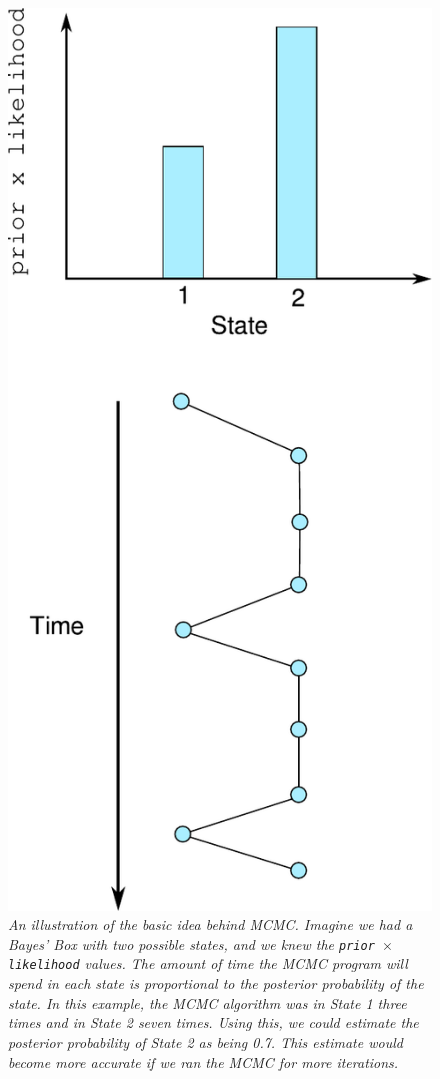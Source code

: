 \begin{figure}[ht!]
\begin{center}
\includegraphics[scale=0.65]{Figures/mcmc.pdf}
\caption{\it An illustration of the basic idea behind MCMC. Imagine we had a
Bayes' Box with two possible states, and we knew the
{\tt prior $\times$ likelihood} values. The amount of time the MCMC program will
spend in each state is proportional to the posterior probability of the state.
In this example, the MCMC algorithm was in State 1 three times and in State 2
seven times. Using this, we could estimate the posterior probability of State 2
as being 0.7. This estimate would become more accurate if we ran the MCMC for
more iterations.\label{fig:mcmc}}
\end{center}
\end{figure}

